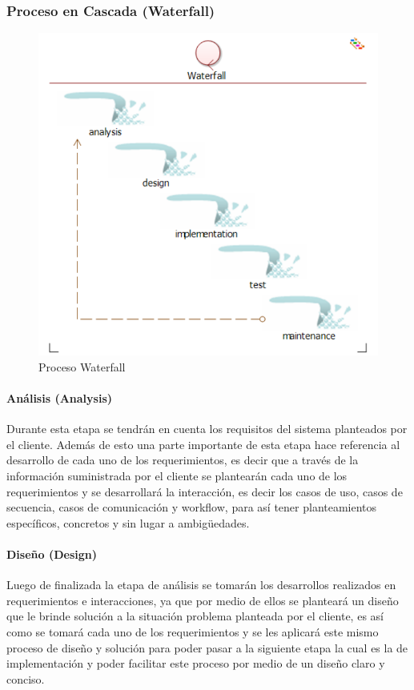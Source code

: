 \subsubsection{Proceso en Cascada (Waterfall)}
\begin{figure}[H]
	\centering
	\includegraphics[scale=0.7,]{imagenes/Metodologia/Waterfall.pdf}
	\caption{Proceso Waterfall}
	\label{fig:cronograma}
\end{figure}

\paragraph{Análisis (Analysis)}
Durante esta etapa se tendrán en cuenta los requisitos del sistema planteados por el cliente. Además de esto una parte importante de esta etapa hace referencia al desarrollo de cada uno de los requerimientos, es decir que a través de la información suministrada por el cliente se plantearán cada uno de los requerimientos y se desarrollará la interacción, es decir los casos de uso, casos de secuencia, casos de comunicación y workflow, para así tener planteamientos específicos, concretos y sin lugar a ambigüedades.

\paragraph{Diseño (Design)}
Luego de finalizada la etapa de análisis se tomarán los desarrollos realizados en requerimientos e interacciones, ya que por medio de ellos se planteará un diseño que le brinde solución a la situación problema planteada por el cliente, es así como se tomará cada uno de los requerimientos y se les aplicará este mismo proceso de diseño y solución para poder pasar a la siguiente etapa la cual es la de implementación y poder facilitar este proceso por medio de un diseño claro y conciso.

